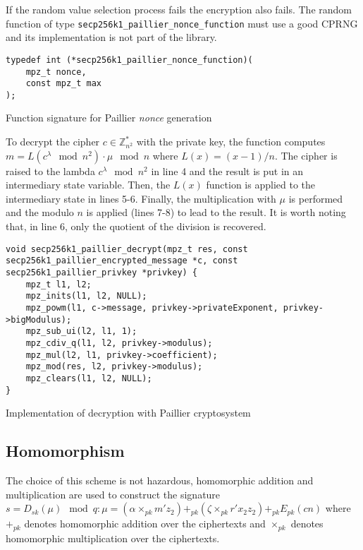 If the random value selection process fails the encryption also fails. The
random function of type \texttt{secp256k1\_paillier\_nonce\_function} must use a
good CPRNG and its implementation is not part of the library.

\begin{listing}
  \begin{verbatim}
typedef int (*secp256k1_paillier_nonce_function)(
    mpz_t nonce,
    const mpz_t max
);
  \end{verbatim}
	\caption{Function signature for Paillier \textit{nonce} generation}
	\label{lst:PaillierNoncesSigFunc}
\end{listing}

To decrypt the cipher $c \in \mathbb{Z}_{n^2}^*$ with the private key, the
function computes $m = L(c^{\lambda} \mod n^2) \cdot \mu \mod n$ where $L(x) = (x -
1) / n$. The cipher is raised to the lambda $c^{\lambda} \mod n^2$ in line 4 and
the result is put in an intermediary state variable. Then, the $L(x)$ function is
applied to the intermediary state in lines 5-6. Finally, the multiplication with
$\mu$ is performed and the modulo $n$ is applied (lines 7-8) to lead to the result. It is
worth noting that, in line 6, only the quotient of the division is recovered.

\begin{listing}
  \begin{verbatim}
void secp256k1_paillier_decrypt(mpz_t res, const secp256k1_paillier_encrypted_message *c, const secp256k1_paillier_privkey *privkey) {
    mpz_t l1, l2;
    mpz_inits(l1, l2, NULL);
    mpz_powm(l1, c->message, privkey->privateExponent, privkey->bigModulus);
    mpz_sub_ui(l2, l1, 1);
    mpz_cdiv_q(l1, l2, privkey->modulus);
    mpz_mul(l2, l1, privkey->coefficient);
    mpz_mod(res, l2, privkey->modulus);
    mpz_clears(l1, l2, NULL);
}
  \end{verbatim}
	\caption{Implementation of decryption with Paillier cryptosystem}
	\label{lst:implDecryptPaillier}
\end{listing}

\subsection{Homomorphism}

The choice of this scheme is not hazardous, homomorphic addition and
multiplication are used to construct the signature $s = D_{sk}(\mu)
\mod q : \mu = (\alpha \times_{pk} m'z_2) +_{pk} (\zeta \times_{pk} r'x_2z_2)
+_{pk} E_{pk}(cn)$ where $+_{pk}$ denotes homomorphic addition over the
ciphertexts and $\times_{pk}$ denotes homomorphic multiplication over the
ciphertexts.

